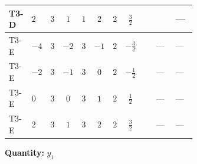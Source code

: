 \documentclass[8pt]{article}
\begin{document}
\begin{landscape}
\begin{longtable}{@{}llcccccc >{\raggedright\arraybackslash}p{0.21\linewidth} >{\raggedright\arraybackslash}p{0.21\linewidth} >{\raggedright\arraybackslash}p{0.21\linewidth}@{}}
\midrule
T3-D & $2$ & $3$ & $1$ & $1$ & $2$ & $2$ & $\frac{3}{2}$ & \scriptsize\adjustbox{max width=\linewidth}{$\begin{gathered} T_{\nu}^{(1)} \left({y_1}\right)_{ij}\end{gathered}$} & \scriptsize\adjustbox{max width=\linewidth}{$\begin{gathered} +\frac{1}{2} (\left({y_2}\,\left({y_2}\right)^{\dagger}\,{y_1}\right)_{ij}+\left({Y_e}\,\left({Y_e}\right)^{\dagger}\,{y_1}\right)_{ij}+3 \left({y_1}\,\left({y_1}\right)^{\dagger}\,{y_1}\right)_{ij})\end{gathered}$} & --- \\
\midrule
T3-E & $-4$ & $3$ & $-2$ & $3$ & $-1$ & $2$ & $-\frac{3}{2}$ & \scriptsize\adjustbox{max width=\linewidth}{$\begin{gathered} T_{\nu}^{(1)} \left({y_1}\right)_{ij}\end{gathered}$} & --- & --- \\
\midrule
T3-E & $-2$ & $3$ & $-1$ & $3$ & $0$ & $2$ & $-\frac{1}{2}$ & \scriptsize\adjustbox{max width=\linewidth}{$\begin{gathered} T_{\nu}^{(1)} \left({y_1}\right)_{ij}\end{gathered}$} & --- & --- \\
\midrule
T3-E & $0$ & $3$ & $0$ & $3$ & $1$ & $2$ & $\frac{1}{2}$ & \scriptsize\adjustbox{max width=\linewidth}{$\begin{gathered} T_{\nu}^{(1)} \left({y_1}\right)_{ij}\end{gathered}$} & --- & --- \\
\midrule
T3-E & $2$ & $3$ & $1$ & $3$ & $2$ & $2$ & $\frac{3}{2}$ & \scriptsize\adjustbox{max width=\linewidth}{$\begin{gathered} T_{\nu}^{(1)} \left({y_1}\right)_{ij}\end{gathered}$} & --- & --- \\
\midrule
\bottomrule
\end{longtable}
\clearpage
\noindent\textbf{Quantity: }$y_1$\par\smallskip

\end{landscape}
\end{document}
